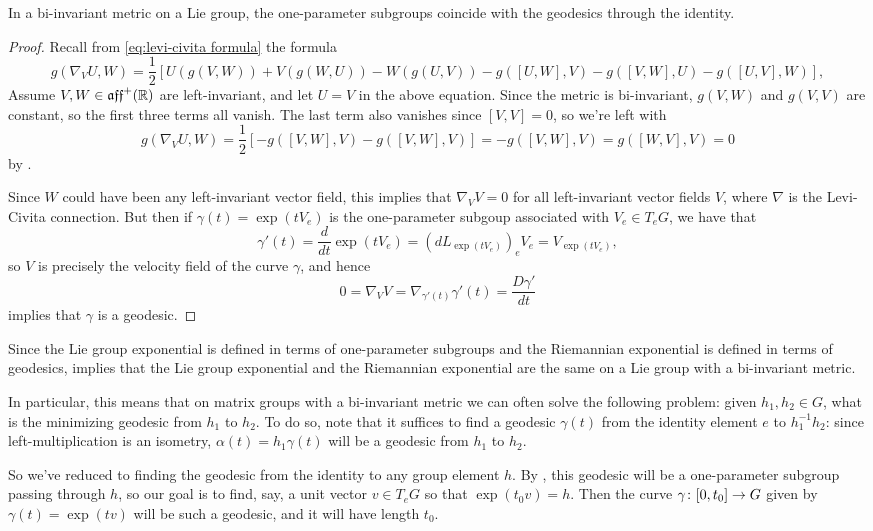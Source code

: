 \begin{theorem}\label{thm:bi-invariant exp}
	In a bi-invariant metric on a Lie group, the one-parameter subgroups coincide with the geodesics through the identity.
\end{theorem}

\begin{proof}
	Recall from \eqref{eq:levi-civita formula} the formula 
	\begin{equation*}
		g(\nabla_VU,W) = \frac{1}{2}\left[U(g(V,W)) + V(g(W,U)) - W(g(U,V)) - g([U,W],V) - g([V,W],U) - g([U,V],W)\right],
	\end{equation*}
	Assume $V,W \in \mathfrak{aff}^+(\mathbb{R})$ are left-invariant, and let $U=V$ in the above equation. Since the metric is bi-invariant, $g(V,W)$ and $g(V,V)$ are constant, so the first three terms all vanish. The last term also vanishes since $[V,V]=0$, so we're left with
	\[
		g(\nabla_VU,W) = \frac{1}{2}\left[- g([V,W],V) - g([V,W],V)\right] = -g([V,W],V) = g([W,V],V) = 0
	\]
	by .
	
	Since $W$ could have been any left-invariant vector field, this implies that $\nabla_VV = 0$ for all left-invariant vector fields $V$, where $\nabla$ is the Levi-Civita connection. But then if $\gamma(t) = \exp(tV_e)$ is the one-parameter subgoup associated with $V_e \in T_eG$, we have that
	\[
		\gamma'(t) = \frac{d}{dt} \exp(tV_e) = (d L_{\exp(tV_e)})_e V_e = V_{\exp(tV_e)},
	\]
	so $V$ is precisely the velocity field of the curve $\gamma$, and hence
	\[
		0 = \nabla_VV = \nabla_{\gamma'(t)} \gamma'(t) = \frac{D\gamma'}{dt}
	\]
	implies that $\gamma$ is a geodesic.
\end{proof}

Since the Lie group exponential is defined in terms of one-parameter subgroups and the Riemannian exponential is defined in terms of geodesics,  implies that the Lie group exponential and the Riemannian exponential are the same on a Lie group with a bi-invariant metric.


In particular, this means that on matrix groups with a bi-invariant metric we can often solve the following problem: given $h_1, h_2 \in G$, what is the minimizing geodesic from $h_1$ to $h_2$. To do so, note that it suffices to find a geodesic $\gamma(t)$ from the identity element $e$ to $h_1^{-1}h_2$: since left-multiplication is an isometry, $\alpha(t) = h_1 \gamma(t)$ will be a geodesic from $h_1$ to $h_2$. 

So we've reduced to finding the geodesic from the identity to any group element $h$. By , this geodesic will be a one-parameter subgroup passing through $h$, so our goal is to find, say, a unit vector $v \in T_e G$ so that $\exp(t_0v) = h$. Then the curve $\gamma \colon\thinspace\! [0,t_0] \to G$ given by $\gamma(t) = \exp(tv)$ will be such a geodesic, and it will have length $t_0$. 

